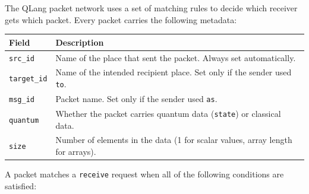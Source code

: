 The QLang packet network uses a set of matching rules to decide which
receiver gets which packet. Every packet carries the following metadata:

\begin{center}
\begin{tabular}{|l|p{10cm}|}
\hline
\textbf{Field} & \textbf{Description} \\
\hline
\texttt{src\_id} & Name of the place that sent the packet. Always set automatically. \\
\hline
\texttt{target\_id} & Name of the intended recipient place. Set only if the sender used \texttt{to}. \\
\hline
\texttt{msg\_id} & Packet name. Set only if the sender used \texttt{as}. \\
\hline
\texttt{quantum} & Whether the packet carries quantum data (\texttt{state}) or classical data. \\
\hline
\texttt{size} & Number of elements in the data (1 for scalar values, array length for arrays). \\
\hline
\end{tabular}
\end{center}

A packet matches a \texttt{receive} request when all of the following
conditions are satisfied:

